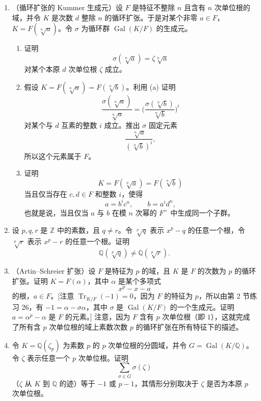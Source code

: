 \begin{enumerate}[label=\arabic*.]
\item （循环扩张的 Kummer 生成元）设 $F$ 是特征不整除 $n$ 且含有 $n$ 次单位根的域，并令 $K$ 是次数 $d$ 整除 $n$ 的循环扩张。于是对某个非零 $a\in F$，$K=F(\sqrt[n]{a})$。令 $\sigma$ 为循环群 $\operatorname{Gal}(K/F)$ 的生成元。
\begin{enumerate}[label=(\alph*)]
\item 证明
\[
\sigma(\sqrt[n]{a})=\zeta\sqrt[n]{a}
\]
对某个本原 $d$ 次单位根 $\zeta$ 成立。
\item 假设 $K=F(\sqrt[n]{a})=F(\sqrt[n]{b})$。利用 (a) 证明
\[
\frac{\sigma(\sqrt[n]{a})}{\sqrt[n]{a}}
=\biggl(\frac{\sigma(\sqrt[n]{b})}{\sqrt[n]{b}}\biggr)^i
\]
对某个与 $d$ 互素的整数 $i$ 成立。推出 $\sigma$ 固定元素
\[
\frac{\sqrt[n]{a}}{(\sqrt[n]{b})^i},
\]
所以这个元素属于 $F$。
\item 证明
\[
K=F(\sqrt[n]{a})=F(\sqrt[n]{b})
\]
当且仅当存在 $c,d\in F$ 和整数 $i$，使得
\[
a=b^i c^n,
\qquad
b=a^i d^n,
\]
也就是说，当且仅当 $a$ 与 $b$ 在模 $n$ 次幂的 $F^\times$ 中生成同一个子群。
\end{enumerate}

\item 设 $p,q,r$ 是 $\mathbb Z$ 中的素数，且 $q\neq r$。令 $\sqrt[p]{q}$ 表示 $x^p-q$ 的任意一个根，令 $\sqrt[p]{r}$ 表示 $x^p-r$ 的任意一个根。证明
\[
\mathbb Q(\sqrt[p]{q})\neq \mathbb Q(\sqrt[p]{r}).
\]

\item （Artin--Schreier 扩张）设 $F$ 是特征为 $p$ 的域，且 $K$ 是 $F$ 的次数为 $p$ 的循环扩张。证明 $K=F(\alpha)$，其中 $\alpha$ 是某个多项式
\[
x^p-x-a
\]
的根，$a\in F$。[注意 $\operatorname{Tr}_{K/F}(-1)=0$，因为 $F$ 的特征为 $p$，所以由第 2 节练习 26，有 $-1=\alpha-\sigma\alpha$，其中 $\sigma$ 是 $\operatorname{Gal}(K/F)$ 的一个生成元。证明 $a=\alpha^p-\alpha$ 是 $F$ 的元素。] 注意，因为 $F$ 含有 $p$ 次单位根（即 $1$），这就完成了所有含 $p$ 次单位根的域上素数次数 $p$ 的循环扩张在所有特征下的描述。

\item 令 $K=\mathbb Q(\zeta_p)$ 为素数 $p$ 的 $p$ 次单位根的分圆域，并令 $G=\operatorname{Gal}(K/\mathbb Q)$。令 $\zeta$ 表示任意一个 $p$ 次单位根。证明
\[
\sum_{\sigma\in G}\sigma(\zeta)
\]
（$\zeta$ 从 $K$ 到 $\mathbb Q$ 的迹）等于 $-1$ 或 $p-1$，其情形分别取决于 $\zeta$ 是否为本原 $p$ 次单位根。


\end{enumerate}
